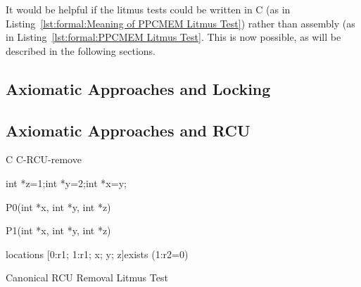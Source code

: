 It would be helpful if the litmus tests could be written in C
(as in Listing~\ref{lst:formal:Meaning of PPCMEM Litmus Test})
rather than assembly
(as in Listing~\ref{lst:formal:PPCMEM Litmus Test}.
This is now possible, as will be described in the following sections.

\subsection{Axiomatic Approaches and Locking}
\label{sec:formal:Axiomatic Approaches and Locking}

\subsection{Axiomatic Approaches and RCU}
\label{sec:formal:Axiomatic Approaches and RCU}

\begin{listing}[tb]
\begin{linelabel}
\begin{VerbatimL}[commandchars=\\\[\]]
C C-RCU-remove

{
	int *z=1;\lnlbl[tail:2]
	int *y=2;\lnlbl[tail:1]
	int *x=y;\lnlbl[head]
}

P0(int *x, int *y, int *z)\lnlbl[P0end]

P1(int *x, int *y, int *z)\lnlbl[P1end]

locations [0:r1; 1:r1; x; y; z]\lnlbl[locations]
exists (1:r2=0)\lnlbl[exists]
\end{VerbatimL}
\end{linelabel}
\caption{Canonical RCU Removal Litmus Test}
\label{lst:formal:Canonical RCU Removal Litmus Test}
\end{listing}

